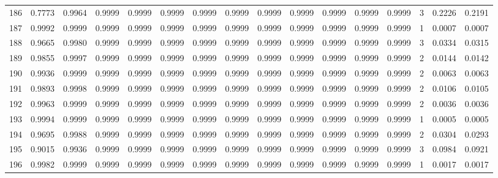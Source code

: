 \begin{tabular}{lrrrrrrrrrrrrrrr}
186 &      0.7773 &  0.9964 &  0.9999 &  0.9999 &  0.9999 &  0.9999 &  0.9999 &  0.9999 &  0.9999 &  0.9999 &   0.9999 &     0.9999 &      3 &                    0.2226 &                     0.2191 \\
187 &      0.9992 &  0.9999 &  0.9999 &  0.9999 &  0.9999 &  0.9999 &  0.9999 &  0.9999 &  0.9999 &  0.9999 &   0.9999 &     0.9999 &      1 &                    0.0007 &                     0.0007 \\
188 &      0.9665 &  0.9980 &  0.9999 &  0.9999 &  0.9999 &  0.9999 &  0.9999 &  0.9999 &  0.9999 &  0.9999 &   0.9999 &     0.9999 &      3 &                    0.0334 &                     0.0315 \\
189 &      0.9855 &  0.9997 &  0.9999 &  0.9999 &  0.9999 &  0.9999 &  0.9999 &  0.9999 &  0.9999 &  0.9999 &   0.9999 &     0.9999 &      2 &                    0.0144 &                     0.0142 \\
190 &      0.9936 &  0.9999 &  0.9999 &  0.9999 &  0.9999 &  0.9999 &  0.9999 &  0.9999 &  0.9999 &  0.9999 &   0.9999 &     0.9999 &      2 &                    0.0063 &                     0.0063 \\
191 &      0.9893 &  0.9998 &  0.9999 &  0.9999 &  0.9999 &  0.9999 &  0.9999 &  0.9999 &  0.9999 &  0.9999 &   0.9999 &     0.9999 &      2 &                    0.0106 &                     0.0105 \\
192 &      0.9963 &  0.9999 &  0.9999 &  0.9999 &  0.9999 &  0.9999 &  0.9999 &  0.9999 &  0.9999 &  0.9999 &   0.9999 &     0.9999 &      2 &                    0.0036 &                     0.0036 \\
193 &      0.9994 &  0.9999 &  0.9999 &  0.9999 &  0.9999 &  0.9999 &  0.9999 &  0.9999 &  0.9999 &  0.9999 &   0.9999 &     0.9999 &      1 &                    0.0005 &                     0.0005 \\
194 &      0.9695 &  0.9988 &  0.9999 &  0.9999 &  0.9999 &  0.9999 &  0.9999 &  0.9999 &  0.9999 &  0.9999 &   0.9999 &     0.9999 &      2 &                    0.0304 &                     0.0293 \\
195 &      0.9015 &  0.9936 &  0.9999 &  0.9999 &  0.9999 &  0.9999 &  0.9999 &  0.9999 &  0.9999 &  0.9999 &   0.9999 &     0.9999 &      3 &                    0.0984 &                     0.0921 \\
196 &      0.9982 &  0.9999 &  0.9999 &  0.9999 &  0.9999 &  0.9999 &  0.9999 &  0.9999 &  0.9999 &  0.9999 &   0.9999 &     0.9999 &      1 &                    0.0017 &                     0.0017 \\

\end{tabular}
